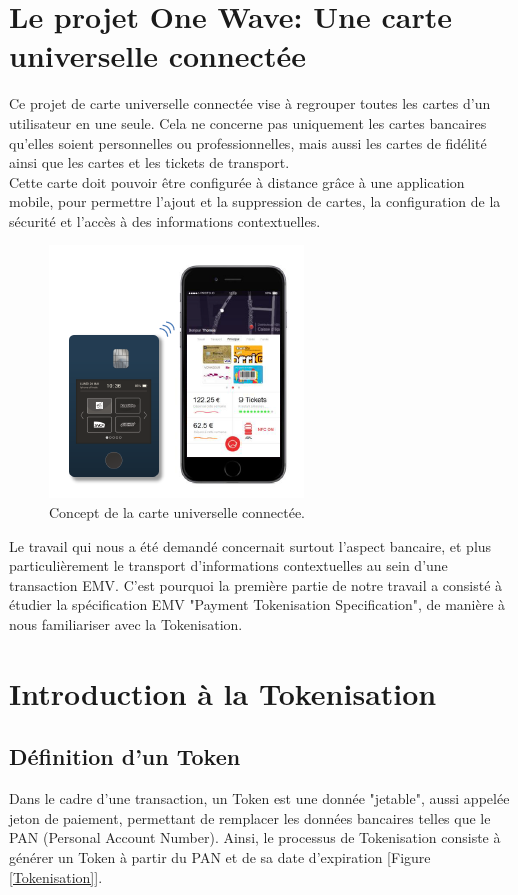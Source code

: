 \documentclass{report}
\begin{document}
\section{Le projet One Wave: Une carte universelle connectée}
Ce projet de carte universelle connectée vise à regrouper toutes les cartes d'un utilisateur en une seule. Cela ne concerne pas uniquement les cartes bancaires qu'elles soient personnelles ou professionnelles, mais aussi les cartes de fidélité ainsi que les cartes et les tickets de transport.\\
Cette carte doit pouvoir être configurée à distance grâce à une application mobile, pour permettre l'ajout et la suppression de cartes, la configuration de la sécurité et l'accès à des informations contextuelles.

\begin{figure}[!h]
    \centering
			\includegraphics[scale=0.5]{img/carte.png}
			\caption{\label{Carte} Concept de la carte universelle connectée.}			
\end{figure}

Le travail qui nous a été demandé concernait surtout l'aspect bancaire, et plus particulièrement le transport d'informations contextuelles au sein d'une transaction EMV. C'est pourquoi la première partie de notre travail a consisté à étudier la spécification EMV "Payment Tokenisation Specification", de manière à nous familiariser avec la Tokenisation.


\section{Introduction à la Tokenisation}
\subsection{Définition d'un Token}
Dans le cadre d'une transaction, un Token est une donnée "jetable", aussi appelée jeton de paiement, permettant de remplacer les données bancaires telles que le PAN (Personal Account Number). Ainsi, le processus de Tokenisation consiste à générer un Token à partir du PAN et de sa date d'expiration [Figure \ref{Tokenisation}].
\end{document}
